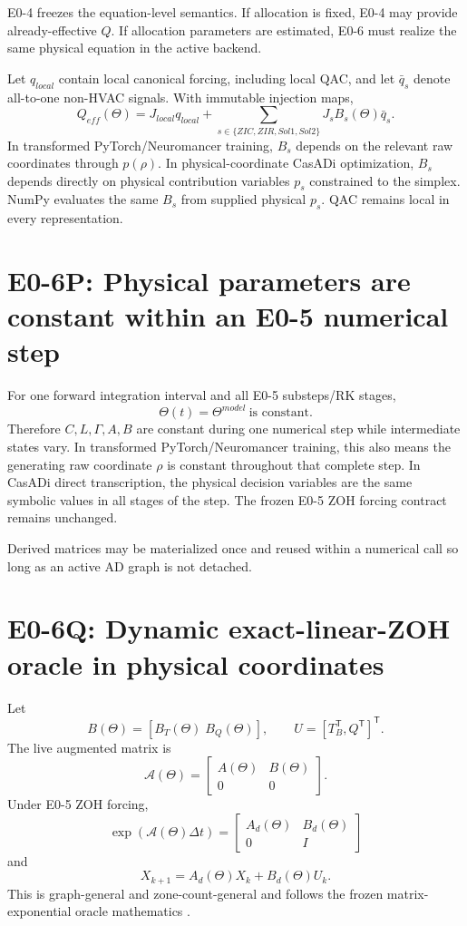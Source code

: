 \documentclass[11pt]{article}
\begin{document}
E0-4 freezes the equation-level semantics. If allocation is fixed, E0-4 may
provide already-effective $Q$. If allocation parameters are estimated, E0-6
must realize the same physical equation in the active backend.

Let $q_{local}$ contain local canonical forcing, including local QAC, and let
$\bar q_s$ denote all-to-one non-HVAC signals. With immutable injection maps,
\[
\boxed{
Q_{eff}(\Theta)=J_{local}q_{local}
+\sum_{s\in\{ZIC,ZIR,Sol1,Sol2\}}J_sB_s(\Theta)\bar q_s.
}
\]
In transformed PyTorch/Neuromancer training, $B_s$ depends on the relevant raw
coordinates through $p(\rho)$. In physical-coordinate CasADi optimization,
$B_s$ depends directly on physical contribution variables $p_s$ constrained to
the simplex. NumPy evaluates the same $B_s$ from supplied physical $p_s$.
QAC remains local in every representation.

\section{E0-6P: Physical parameters are constant within an E0-5 numerical step}

For one forward integration interval and all E0-5 substeps/RK stages,
\[
\boxed{\Theta(t)=\Theta^{model}\ \text{is constant}.}
\]
Therefore $C,L,\Gamma,A,B$ are constant during one numerical step while
intermediate states vary. In transformed PyTorch/Neuromancer training, this also
means the generating raw coordinate $\rho$ is constant throughout that complete
step. In CasADi direct transcription, the physical decision variables are the
same symbolic values in all stages of the step. The frozen E0-5 ZOH forcing
contract remains unchanged.

Derived matrices may be materialized once and reused within a numerical call so
long as an active AD graph is not detached.

\section{E0-6Q: Dynamic exact-linear-ZOH oracle in physical coordinates}

Let
\[
B(\Theta)=[B_T(\Theta)\;B_Q(\Theta)],\qquad
U=[T_B^{\mathsf T},Q^{\mathsf T}]^{\mathsf T}.
\]
The live augmented matrix is
\[
\mathcal A(\Theta)=
\begin{bmatrix}A(\Theta)&B(\Theta)\\0&0\end{bmatrix}.
\]
Under E0-5 ZOH forcing,
\[
\boxed{
\exp(\mathcal A(\Theta)\Delta t)=
\begin{bmatrix}A_d(\Theta)&B_d(\Theta)\\0&I\end{bmatrix}
}
\]
and
\[
\boxed{X_{k+1}=A_d(\Theta)X_k+B_d(\Theta)U_k.}
\]
This is graph-general and zone-count-general and follows the frozen matrix-
exponential oracle mathematics
\cite{Higham2009MatrixExponential,VanLoan1978MatrixExponentialIntegrals}.
\end{document}
